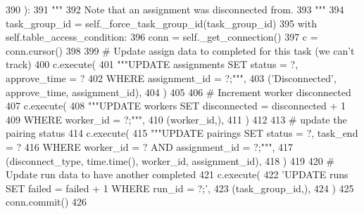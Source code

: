 \begin{DoxyCode}
390     ):
391         \textcolor{stringliteral}{"""}
392 \textcolor{stringliteral}{        Note that an assignment was disconnected from.}
393 \textcolor{stringliteral}{        """}
394         task\_group\_id = self.\_force\_task\_group\_id(task\_group\_id)
395         with self.table\_access\_condition:
396             conn = self.\_get\_connection()
397             c = conn.cursor()
398 
399             \textcolor{comment}{# Update assign data to completed for this task (we can't track)}
400             c.execute(
401                 \textcolor{stringliteral}{"""UPDATE assignments SET status = ?, approve\_time = ?}
402 \textcolor{stringliteral}{                         WHERE assignment\_id = ?;"""},
403                 (\textcolor{stringliteral}{'Disconnected'}, approve\_time, assignment\_id),
404             )
405 
406             \textcolor{comment}{# Increment worker disconnected}
407             c.execute(
408                 \textcolor{stringliteral}{"""UPDATE workers SET disconnected = disconnected + 1}
409 \textcolor{stringliteral}{                         WHERE worker\_id = ?;"""},
410                 (worker\_id,),
411             )
412 
413             \textcolor{comment}{# update the pairing status}
414             c.execute(
415                 \textcolor{stringliteral}{"""UPDATE pairings SET status = ?, task\_end = ?}
416 \textcolor{stringliteral}{                         WHERE worker\_id = ? AND assignment\_id = ?;"""},
417                 (disconnect\_type, time.time(), worker\_id, assignment\_id),
418             )
419 
420             \textcolor{comment}{# Update run data to have another completed}
421             c.execute(
422                 \textcolor{stringliteral}{'UPDATE runs SET failed = failed + 1 WHERE run\_id = ?;'},
423                 (task\_group\_id,),
424             )
425             conn.commit()
426 
\end{DoxyCode}
\mbox{\label{classparlai_1_1mturk_1_1core_1_1mturk__data__handler_1_1MTurkDataHandler_a9395320d0c2a2f00416acd381b5ae0ba}} 
